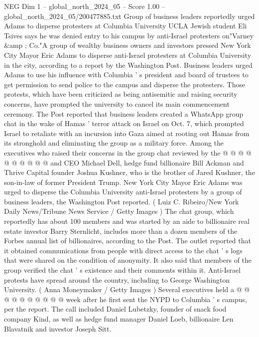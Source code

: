 \begin{textsample}{NEG Dim 1 – global\_north\_2024\_05 – Score 1.00 – global\_north\_2024\_05/200477885.txt}  \label{ex:f1_neg_172}
Group of business leaders reportedly urged Adams to disperse protesters at Columbia University UCLA Jewish student Eli Tsives says he was denied entry to his campus by anti-Israel protesters on"Varney \&amp ; Co."A group of wealthy business owners and investors pressed New York City Mayor Eric Adams to disperse anti-Israel protesters at Columbia University in the city, according to a report by the Washington Post.
Business leaders urged Adams to use his influence with Columbia ' s president and board of trustees to get permission to send police to the campus and disperse the protesters.
Those protests, which have been criticized as being antisemitic and raising security concerns, have prompted the university to cancel its main commencement ceremony.
The Post reported that business leaders created a WhatsApp group chat in the wake of Hamas ' terror attack on Israel on Oct. 7, which prompted Israel to retaliate with an incursion into Gaza aimed at rooting out Hamas from its stronghold and eliminating the group as a military force.
Among the executives who raised their concerns in the group chat reviewed by the @ @ @ @ @ @ @ @ @ @ and CEO Michael Dell, hedge fund billionaire Bill Ackman and Thrive Capital founder Joshua Kushner, who is the brother of Jared Kushner, the son-in-law of former President Trump.
New York City Mayor Eric Adams was urged to disperse the Columbia University anti-Israel protesters by a group of business leaders, the Washington Post reported. ( Luiz C.
Ribeiro/New York Daily News/Tribune News Service / Getty Images ) The chat group, which reportedly has about 100 members and was started by an aide to billionaire real estate investor Barry Sternlicht, includes more than a dozen members of the Forbes annual list of billionaires, according to the Post.
The outlet reported that it obtained communications from people with direct access to the chat ' s logs that were shared on the condition of anonymity.
It also said that members of the group verified the chat ' s existence and their comments within it.
Anti-Israel protests have spread around the country, including to George Washington University. ( Anna Moneymaker / Getty Images ) Several executives held a @ @ @ @ @ @ @ @ @ @ week after he first sent the NYPD to Columbia ' s campus, per the report.
The call included Daniel Lubetzky, founder of snack food company Kind, as well as hedge fund manager Daniel Loeb, billionaire Len Blavatnik and investor Joseph Sitt.

\end{textsample}
